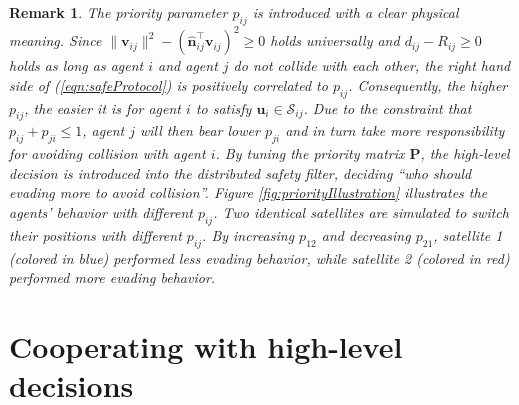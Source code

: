\documentclass{ifacconf}
\newtheorem{remark}{Remark}
\begin{document}
\begin{remark}
   The priority parameter $p_{ij}$ is introduced with a clear physical meaning.
   Since $\|\boldsymbol{v}_{ij}\|^2 -  (\hat{\boldsymbol{n}}_{ij}^{\top}\boldsymbol{v}_{ij} )^2  \ge 0$ holds universally and $d_{ij} - R_{ij} \ge 0$ holds as long as agent $i$ and agent $j$ do not collide with each other, the right hand side of (\ref{eqn:safeProtocol}) is positively correlated to $p_{ij}$.
   Consequently, the higher $p_{ij}$, the easier it is for  agent $i$ to satisfy $\boldsymbol{u}_i \in \mathcal{S}_{ij}$.
   Due to the constraint that $p_{ij} + p_{ji} \le 1$, agent $j$ will then bear lower $p_{ji}$ and in turn take more responsibility for avoiding collision with agent $i$.
   By tuning the priority matrix $\boldsymbol{P}$, the high-level decision is introduced into the distributed safety filter, deciding ``who should evading more to avoid collision''.
   Figure \ref{fig:priorityIllustration} illustrates the agents' behavior with different $p_{ij}$. Two identical satellites are simulated to switch their positions with different $p_{ij}$.
   By increasing $p_{12}$ and decreasing $p_{21}$, satellite 1 (colored in blue) performed less evading behavior, while satellite 2 (colored in red) performed more evading behavior.
\end{remark}

\section{Cooperating with high-level decisions}\label{sec:decision}
\end{document}
